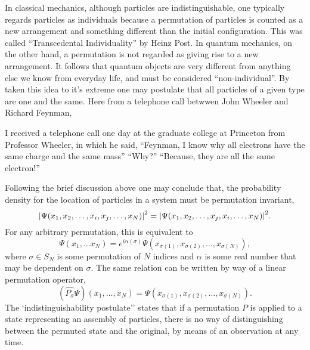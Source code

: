         In classical mechanics, although particles are indistinguishable, one typically
        regards particles as individuals because a permutation of particles is counted as
        a new arrangement and something different than the initial configuration. 
        This was called ``Transcedental
        Individuality'' by Heinz Post\cite{post1963individuality}. In quantum mechanics, on 
        the other hand, a permutation is not regarded as giving rise to a new 
        arrangement. It follows that quantum objects are very different from anything else we
        know from everyday life, and must be considered ``non-individual''. By taken this idea
        to it's extreme one may postulate that all particles of a given type are one and the
        same. Here from a telephone call betwwen John Wheeler and Richard
        Feynman\cite{feynman1965nobel},
        \begin{displayquote}
             I received a telephone call one day at the graduate college at Princeton from 
            Professor Wheeler, in which he said, ``Feynman, I know why all electrons have
            the same charge and the same mass'' ``Why?'' ``Because, they are all the same 
            electron!''           
        \end{displayquote}

        Following the brief discussion above one may conclude that, the probability density
        for the location of particles in a system must be permutation invariant,
        \begin{equation}
            \label{eq:square_wavefunction_pauli}
            \abs{\Psi(x_1, x_2, \dots, x_i, x_j, \dots, x_N)}^2 
            = 
            \abs{\Psi(x_1, x_2, \dots, x_j, x_i, \dots, x_N)}^2.
        \end{equation}
        For any arbitrary permutation, this is equivalent to 
        \begin{equation}
            \Psi(x_1, \dots x_N) 
            =
            e^{i\alpha(\sigma)}\Psi(x_{\sigma(1)}, x_{\sigma(2)}, \dots, x_{\sigma(N)}),
        \end{equation}
        where $\sigma \in S_N$ is some permutation of $N$ indices and $\alpha$ is 
        some real number that may be dependent on $\sigma$.
        The same relation can be written by way of a linear permutation operator,
        \begin{equation}
            (\hat{P_\sigma}\Psi)(x_1, \dots, x_N)
            =
            \Psi(x_{\sigma(1)}, x_{\sigma(2)}, \dots, x_{\sigma(N)}).
        \end{equation}
        The `indistinguishability postulate'' states that if a permutation $P$ is applied 
        to a state representing an assembly of particles, there is no way of distinguishing
        between the permuted state and the original, by means of an observation at any time.
   
